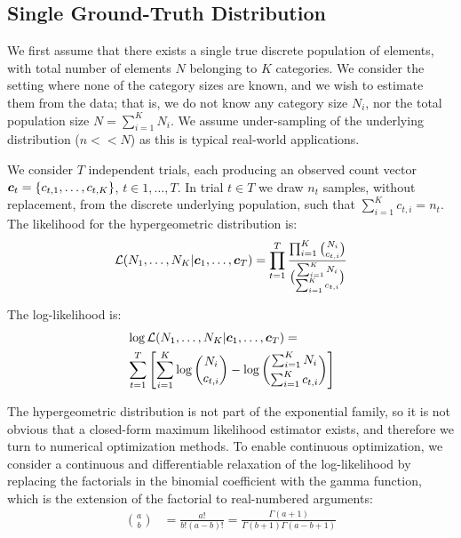 \documentclass{article}
\theoremstyle{plain}
\theoremstyle{definition}
\theoremstyle{remark}
\begin{document}
\subsection{Single Ground-Truth Distribution}
We first assume that there exists a single true discrete population of elements, with total number of elements $N$ belonging to $K$ categories. We consider the setting where none of the category sizes are known, and we wish to estimate them from the data; that is, we do not know any category size $N_i$, nor the total population size $N = \sum_{i=1}^K N_i$. We assume under-sampling of the underlying distribution ($n << N$) as this is typical real-world applications.

We consider $T$ independent trials, each producing an observed count vector ${\bm{c}}_t = \{c_{t,1},\ldots,c_{t,K}\}$, $t \in 1,\ldots,T$. In trial $t \in T$ we draw $n_t$ samples, without replacement, from the discrete underlying population, such that $\sum_{i=1}^K c_{t,i} = n_t$. The likelihood for the hypergeometric distribution is:
\begin{align}
    \mathcal{L}(N_1,\ldots,N_K | {\bm{c}}_1,\ldots,{\bm{c}}_T) = \prod_{t=1}^T \frac{\prod_{i=1}^K \binom{N_i}{c_{t,i}}}{\binom{\sum_{i=1}^K N_i}{\sum_{i=1}^K c_{t,i}}}
\end{align}

The log-likelihood is:
\begin{align}
    \begin{split}
        &\log \mathcal{L}(N_1,\ldots,N_K | {\bm{c}}_1,\ldots,{\bm{c}}_T) = \\
        &\sum_{t=1}^T \left[ \sum_{i=1}^K \log \binom{N_i}{c_{t,i}} - \log \binom{\sum_{i=1}^K N_i}{\sum_{i=1}^K c_{t,i}} \right]
    \end{split}
\end{align}

The hypergeometric distribution is not part of the exponential family, so it is not obvious that a closed-form maximum likelihood estimator exists, and therefore we turn to numerical optimization methods. To enable continuous optimization, we consider a continuous and differentiable relaxation of the log-likelihood by replacing the factorials in the binomial coefficient with the gamma function, which is the extension of the factorial to real-numbered arguments:
\begin{align}
    \binom{a}{b} &= \frac{a!}{b!(a-b)!}
    = \frac{\Gamma(a+1)}{\Gamma(b+1)\Gamma(a-b+1)}
\end{align}
\end{document}
